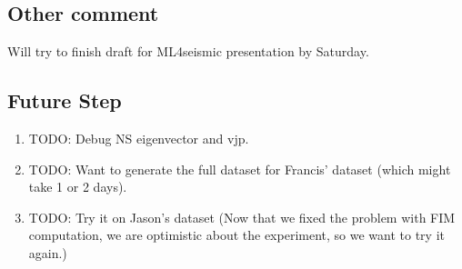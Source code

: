 \documentclass[
]{article}
\providecommand{\tightlist}{%
  \setlength{\itemsep}{0pt}\setlength{\parskip}{0pt}}\usepackage{longtable,booktabs,array}
\begin{document}
\subsection{Other comment}\label{other-comment}

Will try to finish draft for ML4seismic presentation by Saturday.

\subsection{Future Step}\label{future-step}

\begin{enumerate}
\def\labelenumi{\arabic{enumi}.}
\tightlist
\item
  TODO: Debug NS eigenvector and vjp.
\item
  TODO: Want to generate the full dataset for Francis' dataset (which
  might take 1 or 2 days).
\item
  TODO: Try it on Jason's dataset (Now that we fixed the problem with
  FIM computation, we are optimistic about the experiment, so we want to
  try it again.)
\end{enumerate}
\end{document}
